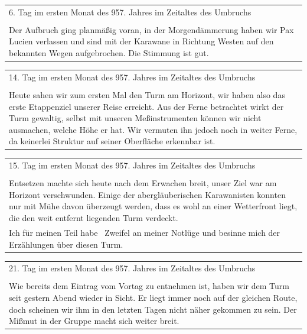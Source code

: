 \begin{longtable}{|p{15cm}|}
\hline
6. Tag im ersten Monat des 957. Jahres im Zeitaltes des Umbruchs\\
\\
Der Aufbruch ging planmäßig voran, in der Morgendämmerung haben wir Pax Lucien verlassen und sind mit 
der Karawane in Richtung Westen auf den bekannten Wegen aufgebrochen. Die Stimmung ist gut.\\
\hline
\end{longtable}

\begin{longtable}{|p{15cm}|}
\hline
14. Tag im ersten Monat des 957. Jahres im Zeitaltes des Umbruchs\\
\\
Heute sahen wir zum ersten Mal den Turm am Horizont, wir haben also das erste Etappenziel unserer 
Reise erreicht. Aus der Ferne betrachtet wirkt der Turm gewaltig, selbst mit unseren Meßinstrumenten 
können wir nicht ausmachen, welche Höhe er hat. Wir vermuten ihn jedoch noch in weiter Ferne, da 
keinerlei Struktur auf seiner Oberfläche erkennbar ist.\\
\hline
\end{longtable}

\begin{longtable}{|p{15cm}|}
\hline
15. Tag im ersten Monat des 957. Jahres im Zeitaltes des Umbruchs\\
\\
Entsetzen machte sich heute nach dem Erwachen breit, unser Ziel war am Horizont verschwunden. 
Einige der abergläuberischen Karawanisten konnten nur mit Mühe davon überzeugt werden, dass es 
wohl an einer Wetterfront liegt, die den weit entfernt liegenden Turm verdeckt.\\
Ich für meinen Teil habe  Zweifel an meiner Notlüge und besinne mich der Erzählungen über diesen Turm.\\
\hline
\end{longtable}

\begin{longtable}{|p{15cm}|}
\hline
21. Tag im ersten Monat des 957. Jahres im Zeitaltes des Umbruchs\\
\\
Wie bereits dem Eintrag vom Vortag zu entnehmen ist, haben wir dem Turm seit gestern Abend wieder in 
Sicht. Er liegt immer noch auf der gleichen Route, doch scheinen wir ihm in den letzten Tagen nicht 
näher gekommen zu sein. Der Mißmut in der Gruppe macht sich weiter breit.\\
\hline
\end{longtable}


